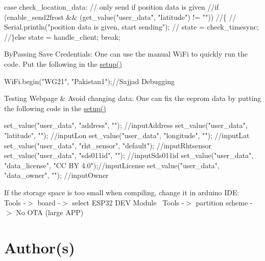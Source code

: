 \begin{DoxyEnumerate}
\begin{DoxyPre}{\ttfamily 
    case check\_location\_data:
       // only send if position data is given
       //if (enable\_send2frost \&\&  (get\_value("user\_data", "latitude") != ""))
       //\{
       //  Serial.println("position data is given, start sending");
       //  state = check\_timesync;
       //\}else
         state = handle\_client;
       break;
 }\end{DoxyPre}

\item By\+Passing Save Credentials\+: One can use the manual Wi\+Fi to quickly run the code. Put the following in the \mbox{\hyperlink{esp32-stationary_8ino_a4fc01d736fe50cf5b977f755b675f11d}{setup()}}~\newline
 
\begin{DoxyPre}{\ttfamily 
  WiFi.begin("WG21", "Pakistan1");//Sajjad Debugging
 }\end{DoxyPre}

\item Testing Webpage \& Avoid changing data\+: One can fix the eeprom data by putting the following code in the \mbox{\hyperlink{esp32-stationary_8ino_a4fc01d736fe50cf5b977f755b675f11d}{setup()}}~\newline
 
\begin{DoxyPre}{\ttfamily 
 set\_value("user\_data", "address", "");       //inputAddress
 set\_value("user\_data", "latitude", "");       //inputLon
 set\_value("user\_data", "longitude", "");      //inputLat
 set\_value("user\_data", "rht\_sensor", "default");  //inputRhtsensor
 set\_value("user\_data", "sds011id", "");       //inputSds011id
 set\_value("user\_data", "data\_license", "CC BY 4.0");//inputLicense
 set\_value("user\_data", "data\_owner", "");     //inputOwner
 }\end{DoxyPre}

\item If the storage space is too small when compiling, change it in arduino I\+DE\+:~\newline
 Tools -\/$>$ board -\/$>$ select E\+S\+P32 D\+EV Module~\newline
 Tools -\/$>$ partition scheme -\/$>$ No O\+TA (large A\+PP)~\newline
 
\end{DoxyEnumerate}\hypertarget{index_author}{}\section{Author(s)}\label{index_author}

